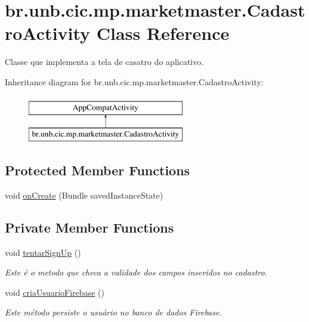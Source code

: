 \hypertarget{classbr_1_1unb_1_1cic_1_1mp_1_1marketmaster_1_1CadastroActivity}{}\section{br.\+unb.\+cic.\+mp.\+marketmaster.\+Cadastro\+Activity Class Reference}
\label{classbr_1_1unb_1_1cic_1_1mp_1_1marketmaster_1_1CadastroActivity}


Classe que implementa a tela de casatro do aplicativo.  


Inheritance diagram for br.\+unb.\+cic.\+mp.\+marketmaster.\+Cadastro\+Activity\+:\begin{figure}[H]
\begin{center}
\leavevmode
\includegraphics[height=2.000000cm]{classbr_1_1unb_1_1cic_1_1mp_1_1marketmaster_1_1CadastroActivity}
\end{center}
\end{figure}
\subsection*{Protected Member Functions}
\begin{DoxyCompactItemize}
\item 
void \mbox{\hyperlink{classbr_1_1unb_1_1cic_1_1mp_1_1marketmaster_1_1CadastroActivity_a38fe031db0996e9858074a92b28d8c4e}{on\+Create}} (Bundle saved\+Instance\+State)
\end{DoxyCompactItemize}
\subsection*{Private Member Functions}
\begin{DoxyCompactItemize}
\item 
void \mbox{\hyperlink{classbr_1_1unb_1_1cic_1_1mp_1_1marketmaster_1_1CadastroActivity_ad557121766858aa8e633f089d0bef30c}{tentar\+Sign\+Up}} ()
\begin{DoxyCompactList}\small\item\em Este é o metodo que checa a validade dos campos inseridos no cadastro. \end{DoxyCompactList}\item 
void \mbox{\hyperlink{classbr_1_1unb_1_1cic_1_1mp_1_1marketmaster_1_1CadastroActivity_abac9fe49bd63de5b80938e71079bf0f4}{cria\+Usuario\+Firebase}} ()
\begin{DoxyCompactList}\small\item\em Este método persiste o usuário no banco de dados Firebase. \end{DoxyCompactList}\end{DoxyCompactItemize}
